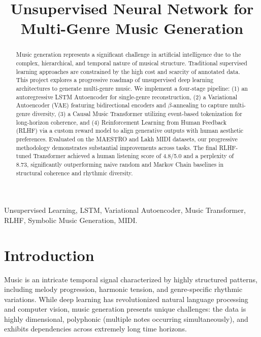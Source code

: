 \documentclass[conference]{IEEEtran}
\begin{document}
\title{Unsupervised Neural Network for Multi-Genre Music Generation\\
}

\author{
}

\maketitle

\begin{abstract}
Music generation represents a significant challenge in artificial intelligence due to the complex, hierarchical, and temporal nature of musical structure. Traditional supervised learning approaches are constrained by the high cost and scarcity of annotated data. This project explores a progressive roadmap of unsupervised deep learning architectures to generate multi-genre music. We implement a four-stage pipeline: (1) an autoregressive LSTM Autoencoder for single-genre reconstruction, (2) a Variational Autoencoder (VAE) featuring bidirectional encoders and $\beta$-annealing to capture multi-genre diversity, (3) a Causal Music Transformer utilizing event-based tokenization for long-horizon coherence, and (4) Reinforcement Learning from Human Feedback (RLHF) via a custom reward model to align generative outputs with human aesthetic preferences. Evaluated on the MAESTRO and Lakh MIDI datasets, our progressive methodology demonstrates substantial improvements across tasks. The final RLHF-tuned Transformer achieved a human listening score of 4.8/5.0 and a perplexity of 8.73, significantly outperforming naive random and Markov Chain baselines in structural coherence and rhythmic diversity.
\end{abstract}

\begin{IEEEkeywords}
Unsupervised Learning, LSTM, Variational Autoencoder, Music Transformer, RLHF, Symbolic Music Generation, MIDI.
\end{IEEEkeywords}

\section{Introduction}
Music is an intricate temporal signal characterized by highly structured patterns, including melody progression, harmonic tension, and genre-specific rhythmic variations. While deep learning has revolutionized natural language processing and computer vision, music generation presents unique challenges: the data is highly dimensional, polyphonic (multiple notes occurring simultaneously), and exhibits dependencies across extremely long time horizons. 
\end{document}
